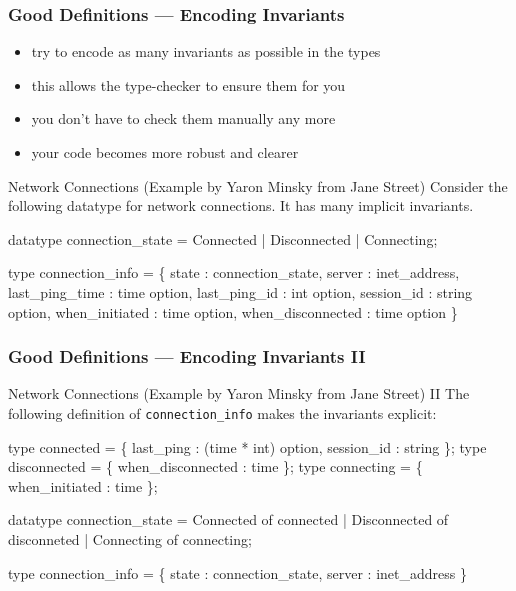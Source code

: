 \begin{frame}[fragile]
\frametitle{Good Definitions --- Encoding Invariants}
\begin{itemize}
\item try to encode as many invariants as possible in the types
\item this allows the type-checker to ensure them for you
\item you don't have to check them manually any more
\item your code becomes more robust and clearer
\end{itemize}

\begin{exampleblock}{Network Connections (Example by Yaron Minsky from Jane Street)}\scriptsize
Consider the following datatype for network connections. It has many implicit invariants.
\begin{semiverbatim}
datatype connection_state = Connected | Disconnected | Connecting;

type connection_info = \{
  state             : connection_state,
  server            : inet_address,
  last_ping_time    : time option,
  last_ping_id      : int option,
  session_id        : string option,
  when_initiated    : time option,
  when_disconnected : time option
\}
\end{semiverbatim}
\end{exampleblock}   
\end{frame}


\begin{frame}[fragile]
\frametitle{Good Definitions --- Encoding Invariants II}
\begin{exampleblock}{Network Connections (Example by Yaron Minsky from Jane Street) II}\scriptsize
The following definition of \texttt{connection\_info} makes the invariants explicit:
\begin{semiverbatim}
type connected    = \{ last_ping         : (time * int) option,
                      session_id        : string \};
type disconnected = \{ when_disconnected : time \};
type connecting   = \{ when_initiated    : time \};

datatype connection_state = 
  Connected of connected
| Disconnected of disconneted
| Connecting of connecting;

type connection_info = \{
  state  : connection_state,
  server : inet_address
\}
\end{semiverbatim}
\end{exampleblock}   
\end{frame}



